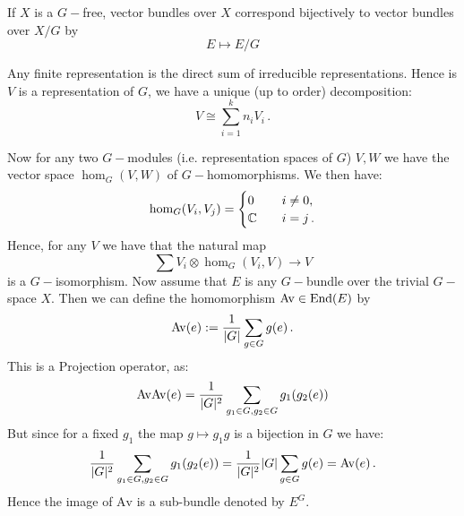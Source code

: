 \begin{prop}
	If $X$ is a $G-$free, vector bundles over $X$ correspond bijectively to vector bundles over $X\slash G$ by 
	\begin{equation*}
		E\mapsto E\slash G
	\end{equation*}
\end{prop}
\newpage
\begin{fact}
	Any finite representation is the direct sum of irreducible representations. Hence is $V$ is a representation of $G$, we have a unique (up to order) decomposition:
	\begin{equation*}
		V\cong \sum_{i=1}^kn_iV_i\, .
	\end{equation*}
\end{fact}
\begin{cor}
	Now for any two $G-$modules (i.e. representation spaces of $G$) $V,W$ we have the vector space $\hom_G(V,W)$ of $G-$homomorphisms. We then have:
	\begin{align*}
		\hom_G(V_i,V_j)=\begin{cases}
			0 &\quad i\neq 0 ,\\
			\mathbb{C} &\quad i=j \, .
		\end{cases}
	\end{align*}
	Hence, for any $V$ we have that the natural map
	\begin{equation*}
		\sum V_i \otimes \hom_G(V_i,V)\to V
	\end{equation*} is a $G-$isomorphism. Now assume that $E$ is any $G-$bundle over the trivial $G-$space $X$. Then we can define the homomorphism $\mathrm{Av}\in \operatorname{\mathrm{End}}(E)$ by
	\begin{align*}
		\mathrm{Av}(e):=\frac{1}{\lvert G\rvert}\sum_{g\in G}g(e)\, .
	\end{align*} This is a Projection operator, as:
	\begin{align*}
		\mathrm{Av}\mathrm{Av}(e)=\frac{1}{\lvert G\rvert^2}\sum_{g_1\in G,g_2 \in G}g_1(g_2(e))
	\end{align*} But since for a fixed $g_1$ the map $g\mapsto g_1 g$ is a bijection in $G$ we have:
	\begin{align*}
		\frac{1}{\lvert G\rvert^2}\sum_{g_1\in G,g_2 \in G}g_1(g_2(e))=\frac{1}{\lvert G\rvert^2}\lvert G\rvert\sum_{g \in G}g(e)=\mathrm{Av}(e)\, .
	\end{align*} Hence the image of $\mathrm{Av}$ is a sub-bundle denoted by $E^G$.
\end{cor}


